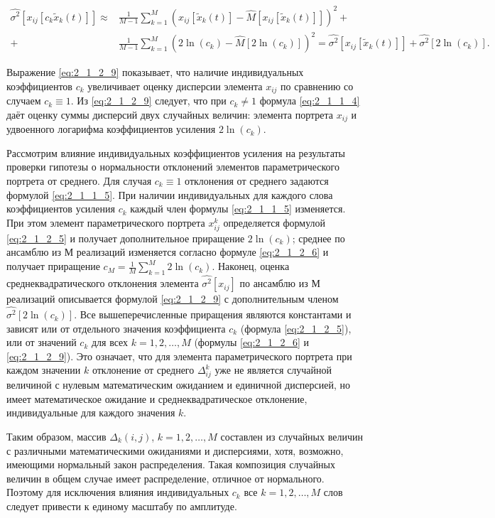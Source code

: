 \begin{equation} \label{eq:2_1_2_9}
\begin{split}
\widehat{\sigma^2} [x_{ij} [c_k \tilde{x}_k(t)]] \approx &
\frac{1}{M-1} \sum_{k=1}^M (x_{ij}[\tilde{x}_k(t)] - \widehat{M} [x_{ij}[\tilde{x}_k(t)]])^2 + \\
+ & \frac{1}{M-1} \sum_{k=1}^M (2 \ln(c_k) - \widehat{M}[2 \ln(c_k)])^2 =
\widehat{\sigma^2} [x_{ij}[\tilde{x}_k(t)]] + \widehat{\sigma^2} [2 \ln(c_k)].
\end{split}
\end{equation}

Выражение \eqref{eq:2_1_2_9} показывает, что наличие индивидуальных коэффициентов $c_k$ увеличивает оценку дисперсии элемента $x_{ij}$ по сравнению со случаем $c_k \equiv 1$.
Из \eqref{eq:2_1_2_9} следует, что при $c_k \ne 1$ формула \eqref{eq:2_1_1_4} даёт оценку суммы дисперсий двух случайных величин: элемента портрета $x_{ij}$ и удвоенного логарифма коэффициентов усиления $2 \ln(c_k)$.

Рассмотрим влияние индивидуальных коэффициентов усиления на результаты проверки гипотезы о нормальности отклонений элементов параметрического портрета от среднего.
Для случая $c_k \equiv 1$ отклонения от среднего задаются формулой \eqref{eq:2_1_1_5}.
При наличии индивидуальных для каждого слова коэффициентов усиления $c_k$ каждый член формулы \eqref{eq:2_1_1_5} изменяется.
При этом элемент параметрического портрета $x_{ij}^k$ определяется формулой \eqref{eq:2_1_2_5} и получает дополнительное приращение $2 \ln(c_k)$; среднее по ансамблю из $М$ реализаций изменяется согласно формуле \eqref{eq:2_1_2_6} и получает приращение $c_M = \frac{1}{M} \sum_{k=1}^M 2 \ln(c_k)$.
Наконец, оценка среднеквадратического отклонения элемента $\widehat{\sigma^2} [x_{ij}]$ по ансамблю из $М$ реализаций описывается формулой \eqref{eq:2_1_2_9} с дополнительным членом $\widehat{\sigma^2} [2 \ln(c_k)]$.
Все вышеперечисленные приращения являются константами и зависят или от отдельного значения коэффициента $c_k$ (формула \eqref{eq:2_1_2_5}), или от значений $c_k$ для всех $k = 1, 2, \dots, M$ (формулы \eqref{eq:2_1_2_6} и \eqref{eq:2_1_2_9}).
Это означает, что для элемента параметрического портрета при каждом значении $k$ отклонение от среднего $\Delta_{ij}^k$ уже не является случайной величиной с нулевым математическим ожиданием и единичной дисперсией, но имеет математическое ожидание и среднеквадратическое отклонение, индивидуальные для каждого значения $k$.

Таким образом, массив $\Delta_{k} (i, j)$, $k = 1, 2, \dots, M$ составлен из случайных величин с различными математическими ожиданиями и дисперсиями, хотя, возможно, имеющими нормальный закон распределения.
Такая композиция случайных величин в общем случае имеет распределение, отличное от нормального.
Поэтому для исключения влияния индивидуальных $c_k$ все $k = 1, 2, \dots, M$ слов следует привести к единому масштабу по амплитуде.

